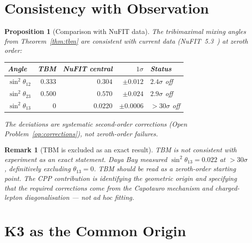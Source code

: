 \documentclass[11pt]{article}
\newtheorem{proposition}[theorem]{Proposition}
\newtheorem{remark}{Remark}[section]
\begin{document}
\section{Consistency with Observation}

\begin{proposition}[Comparison with NuFIT data]
\label{prop:nufit}
The tribimaximal mixing angles from Theorem~\ref{thm:tbm} are
consistent with current data (NuFIT~5.3~\cite{nufit53})
at zeroth order:
\begin{center}
\renewcommand{\arraystretch}{1.3}
\begin{tabular}{lrrrl}
\toprule
Angle & TBM & NuFIT central & $1\sigma$ & Status \\
\midrule
$\sin^2\theta_{12}$ & $0.333$ & $0.304$ & $\pm 0.012$ & $2.4\sigma$ off \\
$\sin^2\theta_{23}$ & $0.500$ & $0.570$ & $\pm 0.024$ & $2.9\sigma$ off \\
$\sin^2\theta_{13}$ & $0$ & $0.0220$ & $\pm 0.0006$ & $>30\sigma$ off \\
\bottomrule
\end{tabular}
\end{center}
The deviations are systematic second-order corrections
(Open Problem~\ref{op:corrections}), not zeroth-order failures.
\end{proposition}

\begin{remark}[TBM is excluded as an exact result]
TBM is \emph{not} consistent with experiment as an exact statement.
Daya Bay measured $\sin^2\theta_{13} = 0.022$ at $>30\sigma$,
definitively excluding $\theta_{13} = 0$.
TBM should be read as a \emph{zeroth-order starting point}.
The CPP contribution is identifying the geometric origin and
specifying that the required corrections come from the Capotauro
mechanism and charged-lepton diagonalisation --- not ad hoc fitting.
\end{remark}

\section{K3 as the Common Origin}
\end{document}
